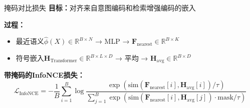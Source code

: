 \documentclass[aspectratio=1610]{beamer}
\begin{document}
    \begin{frame}{掩码对比损失}
        \textbf{目标：}对齐来自意图编码和检索增强编码的嵌入

        \vspace{0.2cm}
        \textbf{过程：}
        \begin{itemize}
            \item 最近语义$\hat{\phi}(X) \in \mathbb{R}^{B \times N}$ → MLP → $\mathbf{F}_{\text{nearest}} \in \mathbb{R}^{B \times K}$
            \item 符号嵌入$\mathbf{H}_{\text{Transformer}} \in \mathbb{R}^{B \times L \times D}$ → 平均 → $\mathbf{H}_{\text{avg}} \in \mathbb{R}^{B \times D}$
        \end{itemize}

        \vspace{0.2cm}
        \textbf{带掩码的InfoNCE损失：}
        \begin{equation}
            \mathcal{L}_{\text{InfoNCE}} = - \frac{1}{B} \sum_{i=1}^{B} \log \frac{\exp\left(\text{sim}(\mathbf{F}_{\text{nearest}}[i], \mathbf{H}_{\text{avg}}[i]) / \tau\right)}{\sum_{j=1}^{B} \exp\left(\text{sim}(\mathbf{F}_{\text{nearest}}[i], \mathbf{H}_{\text{avg}}[j]) \cdot \text{mask} / \tau\right)}
        \end{equation}


    \end{frame}
\end{document}
